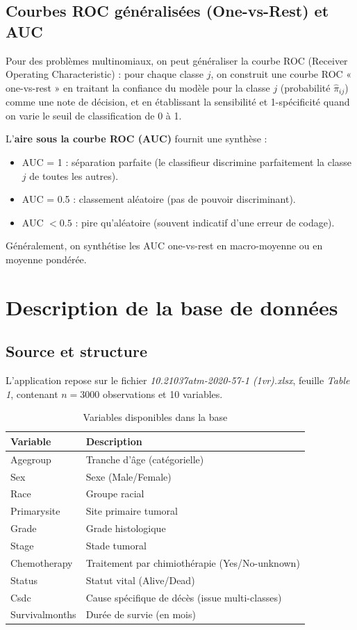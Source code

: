 \documentclass[12pt,a4paper]{article}
\begin{document}
\subsection{Courbes ROC généralisées (One-vs-Rest) et AUC}

Pour des problèmes multinomiaux, on peut généraliser la courbe ROC (Receiver Operating Characteristic) : pour chaque classe $j$, on construit une courbe ROC « one-vs-rest » en traitant la confiance du modèle pour la classe $j$ (probabilité $\widehat{\pi}_{ij}$) comme une note de décision, et en établissant la sensibilité et 1-spécificité quand on varie le seuil de classification de 0 à 1.

L'\textbf{aire sous la courbe ROC (AUC)} fournit une synthèse :
\begin{itemize}
    \item AUC = 1 : séparation parfaite (le classifieur discrimine parfaitement la classe $j$ de toutes les autres).
    \item AUC = 0.5 : classement aléatoire (pas de pouvoir discriminant).
    \item AUC $< 0.5$ : pire qu'aléatoire (souvent indicatif d'une erreur de codage).
\end{itemize}

Généralement, on synthétise les AUC one-vs-rest en macro-moyenne ou en moyenne pondérée.

\section{Description de la base de données}

\subsection{Source et structure}

L'application repose sur le fichier \textit{10.21037atm-2020-57-1 (1vr).xlsx}, feuille \textit{Table 1}, contenant $n = 3000$ observations et 10 variables.

\begin{table}[H]
\centering
\caption{Variables disponibles dans la base}
\begin{tabular}{p{4.1cm}p{8.9cm}}
\toprule
\textbf{Variable} & \textbf{Description} \\
\midrule
Agegroup & Tranche d'âge (catégorielle) \\
Sex & Sexe (Male/Female) \\
Race & Groupe racial \\
Primarysite & Site primaire tumoral \\
Grade & Grade histologique \\
Stage & Stade tumoral \\
Chemotherapy & Traitement par chimiothérapie (Yes/No-unknown) \\
Status & Statut vital (Alive/Dead) \\
Csdc & Cause spécifique de décès (issue multi-classes) \\
Survivalmonths & Durée de survie (en mois) \\
\bottomrule
\end{tabular}
\end{table}
\end{document}
